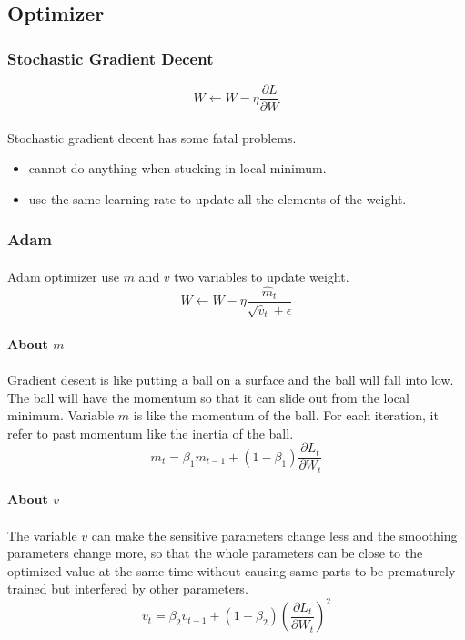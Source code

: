 \subsection{Optimizer}
\subsubsection{Stochastic Gradient Decent}
$$W \leftarrow  W - \eta \frac{\partial L}{\partial W}$$
\paragraph{}
Stochastic gradient decent has some fatal problems.
\begin{itemize}
    \item cannot do anything when stucking in local minimum.
    \item use the same learning rate to update all the elements of the weight.
\end{itemize}
\subsubsection{Adam}
\paragraph{}
Adam optimizer use $m$ and $v$ two variables to update weight. 
$$W \leftarrow W - \eta \frac{\hat{m}_t}{\sqrt{\hat{v}_t} + \epsilon}$$
\paragraph{About $m$}
\paragraph{}
Gradient desent is like putting a ball on a surface and the ball will fall into low. The ball will have the momentum so that it can slide out from the local minimum. Variable $m$ is like the momentum of the ball. For each iteration, it refer to past momentum like the inertia of the ball.
$$m_t = \beta_1m_{t-1} + (1 - \beta_1)\frac{\partial L_t}{\partial W_t}$$
\paragraph{About $v$}
\paragraph{}
The variable $v$ can make the sensitive parameters change less and the smoothing parameters change more, so that the whole parameters can be close to the optimized value at the same time without causing same parts to be prematurely trained but interfered by other parameters.
$$v_t = \beta_2v_{t-1} + (1 - \beta_2)(\frac{\partial L_t}{\partial W_t})^2$$
